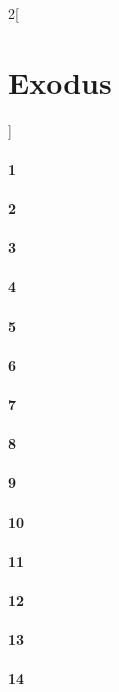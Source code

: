 \documentclass{book}
\begin{document}
\begin{multicols}{2}[\part{Exodus}]
\subsection*{1}
\subsection*{2}
\subsection*{3}
\subsection*{4}
\subsection*{5}
\subsection*{6}
\subsection*{7}
\subsection*{8}
\subsection*{9}
\subsection*{10}
\subsection*{11}
\subsection*{12}
\subsection*{13}
\subsection*{14}

\end{multicols}
\end{document}
